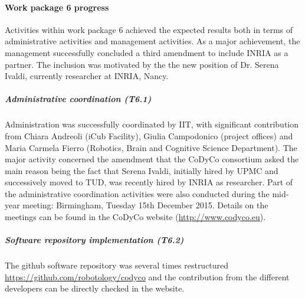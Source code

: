 

\paragraph{Work package 6 progress}

Activities within work package 6 achieved the expected results both in terms of administrative activities and management activities. As a major achievement, the management successfully concluded a third amendment to include INRIA as a partner. The inclusion was motivated by the the new position of Dr. Serena Ivaldi, currently researcher at INRIA, Nancy. 

\subparagraph{Administrative coordination (T6.1)}
Administration was successfully coordinated by IIT, with significant contribution from Chiara Andreoli (iCub Facility), Giulia Campodonico (project offices) and Maria Carmela Fierro (Robotics, Brain and Cognitive Science Department). The major activity concerned the amendment that the CoDyCo consortium asked the main reason being the fact that Serena Ivaldi, initially hired by UPMC and successively moved to TUD, was recently hired by INRIA as researcher. Part of the administrative coordination activities were also conducted during the mid-year meeting: Birmingham, Tuesday 15th December 2015.  Details on the meetings can be found in the CoDyCo website (\url{http://www.codyco.eu}).

\subparagraph{Software repository implementation (T6.2)}

The github software repository was several times restructured \url{https://github.com/robotology/codyco} and the contribution from the different developers can be directly checked in the website. 